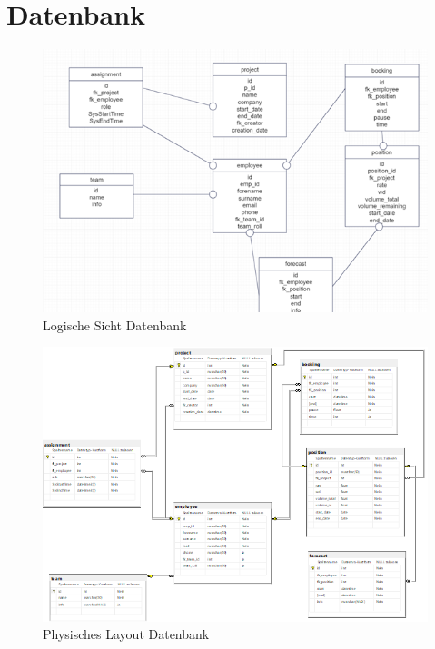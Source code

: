 \documentclass{article}
\begin{document}
\newpage
\clearpage

\section{Datenbank}

\begin{figure}[h]
    \centering
    \includegraphics[width= \textwidth]{images/logischeAnsicht.png}
    \caption{Logische Sicht Datenbank}
    \label{fig:beispiel}
\end{figure}

\begin{figure}[h]
    \centering
    \includegraphics[width= \textwidth]{images/datenbankphysisches-Layout.png}
    \caption{Physisches Layout Datenbank}
    \label{fig:beispiel}
\end{figure}
\end{document}
